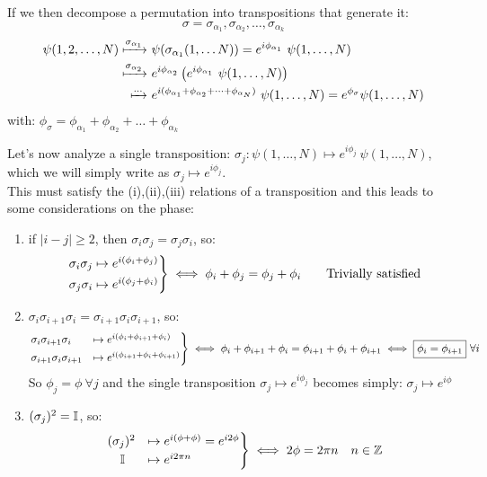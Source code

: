 If we then decompose a permutation into transpositions that generate it:
$$\sigma = \sigma_{\alpha_1}, \sigma_{\alpha_2}, \dots, \sigma_{\alpha_k} $$
\begin{align*}
    \psi(1,2,\dots, N) \xmapsto{\sigma_{\alpha_1}}&\ \psi(\sigma_{\alpha_1}(1,\dots N)) = e^{i\phi_{\alpha_1}}\ \psi(1,\dots, N) \\
    \xmapsto{\sigma_{\alpha_2}}&\ e^{i\phi_{\alpha_2}} \left(e^{i\phi_{\alpha_1}}\ \psi(1,\dots, N)\right) \\
    \xmapsto{\dots}&\ e^{i(\phi_{\alpha_1} + \phi_{\alpha_2} + \dots + \phi_{\alpha_N})}\ \psi(1,\dots, N) = e^{\phi_\sigma}\psi(1,\dots, N)
\end{align*}
with: $\phi_\sigma = \phi_{\alpha_1} + \phi_{\alpha_2} + \dots + \phi_{\alpha_k}$

Let's now analyze a single transposition: $\sigma_j : \psi(1,\dots, N) \mapsto e^{i\phi_j} \ \psi(1,\dots, N)$, which we will simply write as $\sigma_j \mapsto e^{i\phi_j}$.\\
This must satisfy the (i),(ii),(iii) relations of a transposition and this leads to some considerations on the phase:
\begin{enumerate}[label=\roman*)]
    \item if $|i-j| \ge 2$, then $\sigma_i\sigma_j = \sigma_j\sigma_i$, so:
    \begin{align*}
    \begin{rcases}
        \sigma_i\sigma_j \mapsto e^{i(\phi_i + \phi_j)} \\
        \sigma_j\sigma_i \mapsto e^{i(\phi_j + \phi_i)}
    \end{rcases}
    \iff \phi_i + \phi_j = \phi_j + \phi_i \qquad \text{Trivially satisfied}
    \end{align*}
    
    \item $\sigma_i\sigma_{i+1} \sigma_i = \sigma_{i+1}\sigma_i\sigma_{i+1}$, so:
    \begin{equation*}
    \begin{rcases}    
        \sigma_i\sigma_{i+1}\sigma_i &\mapsto e^{i(\phi_i + \phi_{i+1} + \phi_i)} \\
        \sigma_{i+1}\sigma_i\sigma_{i+1} &\mapsto e^{i(\phi_{i+1} + \phi_i + \phi_{i+1})}
    \end{rcases}
    \iff \phi_i + \phi_{i+1} + \phi_i = \phi_{i+1} + \phi_i + \phi_{i+1}
    \iff \boxed{\phi_i = \phi_{i+1}} \ \forall i
    \end{equation*}
    So $\phi_j = \phi \ \forall j$ and the single transposition $\sigma_j \mapsto e^{i\phi_j}$ becomes simply: $\sigma_j \mapsto e^{i\phi}$

    \item $(\sigma_j)^2 = \mathbb{I}$, so:
    \begin{align*}
        \begin{rcases}
            (\sigma_j)^2 &\mapsto e^{i(\phi + \phi)} = e^{i2\phi} \\
            \quad \mathbb{I} &\mapsto e^{i2\pi n}
        \end{rcases}
        \iff 2\phi = 2\pi n \quad n\in \mathbb{Z}
    \end{align*}
\end{enumerate}

